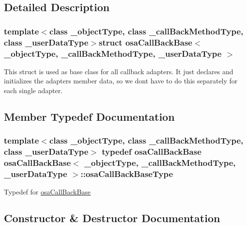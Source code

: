 \subsection{Detailed Description}
\subsubsection*{template$<$class \+\_\+object\+Type, class \+\_\+call\+Back\+Method\+Type, class \+\_\+user\+Data\+Type$>$struct osa\+Call\+Back\+Base$<$ \+\_\+object\+Type, \+\_\+call\+Back\+Method\+Type, \+\_\+user\+Data\+Type $>$}

This struct is used as base class for all callback adapters. It just declares and initializes the adapter\textquotesingle{}s member data, so we don\textquotesingle{}t have to do this separately for each single adapter. 

\subsection{Member Typedef Documentation}
\hypertarget{structosa_call_back_base_ac0992ce98eed821dbeae7d6b41bc6682}{}
\subsubsection[{osa\+Call\+Back\+Base\+Type}]{\setlength{\rightskip}{0pt plus 5cm}template$<$class \+\_\+object\+Type, class \+\_\+call\+Back\+Method\+Type, class \+\_\+user\+Data\+Type$>$ typedef {\bf osa\+Call\+Back\+Base} {\bf osa\+Call\+Back\+Base}$<$ \+\_\+object\+Type, \+\_\+call\+Back\+Method\+Type, \+\_\+user\+Data\+Type $>$\+::{\bf osa\+Call\+Back\+Base\+Type}}\label{structosa_call_back_base_ac0992ce98eed821dbeae7d6b41bc6682}
Typedef for \hyperlink{structosa_call_back_base}{osa\+Call\+Back\+Base} 

\subsection{Constructor \& Destructor Documentation}
\hypertarget{structosa_call_back_base_a84cca5d9c6af2fc46d9fb0e3012e6a79}{}
